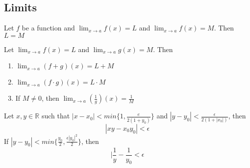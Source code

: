 \documentclass{report}
\begin{document}
  \subsection{Limits}%
  
   {
    Let $f$ be a function and $\lim_{x \to a} f(x) = L$ and
    $\lim_{x \to a} f(x) = M$.  Then $L=M$
  }

   {
    Let $\lim_{x \to a} f(x) = L$ and $\lim_{x \to a} g(x) = M$.  Then
    \begin{enumerate}
      \item $\lim_{x \to a} (f+g)(x) = L+M$
      \item $\lim_{x \to a} (f \cdot g)(x) = L \cdot M$
      \item If $M \neq 0$, then $\lim_{x \to a} (\frac{1}{g})(x) = \frac{1}{M}$
    \end{enumerate}
  }
  \thm{ } {
    Let $x,y \in  \mathbb{R}$ such that $|x-x_0| < min \{1, \frac{e}{2(1+y_0)} \}$ and $|y - y_0| <  \frac{\epsilon}{2 ( 1 + |x_0|)}$, then
    \[ |xy - x_0y_0| < \epsilon \]
  }
  \thm{ } {
    If $|y - y_0| < min \{  \frac{y_0}{2} , \frac{\epsilon|y_0|^2}{2} \}$,
    then
      \[ |\frac{1}{y} - \frac{1}{y_0} < \epsilon \]
  }
\end{document}
